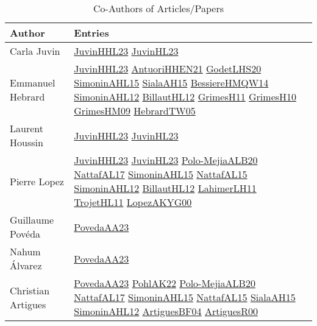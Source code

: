 {\scriptsize
\begin{longtable}{p{4cm}p{15cm}}
\caption{Co-Authors of Articles/Papers}\\ \toprule
Author & Entries \\ \midrule\endhead
\bottomrule
\endfoot
Carla Juvin & \href{papers/JuvinHHL23.pdf}{JuvinHHL23}\cite{JuvinHHL23} \href{papers/JuvinHL23.pdf}{JuvinHL23}\cite{JuvinHL23} \\
Emmanuel Hebrard & \href{papers/JuvinHHL23.pdf}{JuvinHHL23}\cite{JuvinHHL23} \href{papers/AntuoriHHEN21.pdf}{AntuoriHHEN21}\cite{AntuoriHHEN21} \href{papers/GodetLHS20.pdf}{GodetLHS20}\cite{GodetLHS20} \href{articles/SimoninAHL15.pdf}{SimoninAHL15}\cite{SimoninAHL15} \href{papers/SialaAH15.pdf}{SialaAH15}\cite{SialaAH15} \href{papers/BessiereHMQW14.pdf}{BessiereHMQW14}\cite{BessiereHMQW14} \href{papers/SimoninAHL12.pdf}{SimoninAHL12}\cite{SimoninAHL12} \href{papers/BillautHL12.pdf}{BillautHL12}\cite{BillautHL12} \href{papers/GrimesH11.pdf}{GrimesH11}\cite{GrimesH11} \href{papers/GrimesH10.pdf}{GrimesH10}\cite{GrimesH10} \href{papers/GrimesHM09.pdf}{GrimesHM09}\cite{GrimesHM09} \href{papers/HebrardTW05.pdf}{HebrardTW05}\cite{HebrardTW05} \\
Laurent Houssin & \href{papers/JuvinHHL23.pdf}{JuvinHHL23}\cite{JuvinHHL23} \href{papers/JuvinHL23.pdf}{JuvinHL23}\cite{JuvinHL23} \\
Pierre Lopez & \href{papers/JuvinHHL23.pdf}{JuvinHHL23}\cite{JuvinHHL23} \href{papers/JuvinHL23.pdf}{JuvinHL23}\cite{JuvinHL23} \href{articles/Polo-MejiaALB20.pdf}{Polo-MejiaALB20}\cite{Polo-MejiaALB20} \href{articles/NattafAL17.pdf}{NattafAL17}\cite{NattafAL17} \href{articles/SimoninAHL15.pdf}{SimoninAHL15}\cite{SimoninAHL15} \href{articles/NattafAL15.pdf}{NattafAL15}\cite{NattafAL15} \href{papers/SimoninAHL12.pdf}{SimoninAHL12}\cite{SimoninAHL12} \href{papers/BillautHL12.pdf}{BillautHL12}\cite{BillautHL12} \href{papers/LahimerLH11.pdf}{LahimerLH11}\cite{LahimerLH11} \href{articles/TrojetHL11.pdf}{TrojetHL11}\cite{TrojetHL11} \href{articles/LopezAKYG00.pdf}{LopezAKYG00}\cite{LopezAKYG00} \\
Guillaume Pov{\'{e}}da & \href{papers/PovedaAA23.pdf}{PovedaAA23}\cite{PovedaAA23} \\
Nahum {\'{A}}lvarez & \href{papers/PovedaAA23.pdf}{PovedaAA23}\cite{PovedaAA23} \\
Christian Artigues & \href{papers/PovedaAA23.pdf}{PovedaAA23}\cite{PovedaAA23} \href{articles/PohlAK22.pdf}{PohlAK22}\cite{PohlAK22} \href{articles/Polo-MejiaALB20.pdf}{Polo-MejiaALB20}\cite{Polo-MejiaALB20} \href{articles/NattafAL17.pdf}{NattafAL17}\cite{NattafAL17} \href{articles/SimoninAHL15.pdf}{SimoninAHL15}\cite{SimoninAHL15} \href{articles/NattafAL15.pdf}{NattafAL15}\cite{NattafAL15} \href{papers/SialaAH15.pdf}{SialaAH15}\cite{SialaAH15} \href{papers/SimoninAHL12.pdf}{SimoninAHL12}\cite{SimoninAHL12} \href{papers/ArtiguesBF04.pdf}{ArtiguesBF04}\cite{ArtiguesBF04} \href{articles/ArtiguesR00.pdf}{ArtiguesR00}\cite{ArtiguesR00} \\

\end{longtable}}
